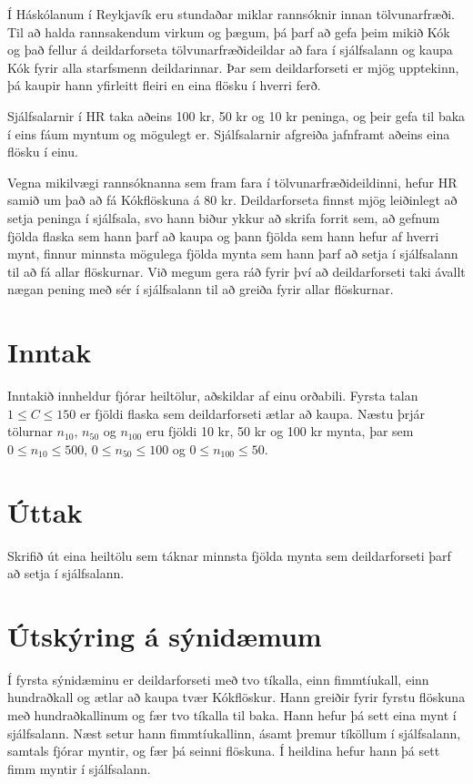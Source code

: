
Í Háskólanum í Reykjavík eru stundaðar miklar rannsóknir innan tölvunarfræði.
Til að halda rannsakendum virkum og þægum, þá þarf að gefa þeim mikið Kók og
það fellur á deildarforseta tölvunarfræðideildar að fara í sjálfsalann og kaupa
Kók fyrir alla starfsmenn deildarinnar. Þar sem deildarforseti er mjög
upptekinn, þá kaupir hann yfirleitt fleiri en eina flösku í hverri ferð.

Sjálfsalarnir í HR taka aðeins 100 kr, 50 kr og 10 kr peninga, og þeir gefa til
baka í eins fáum myntum og mögulegt er. Sjálfsalarnir afgreiða jafnframt aðeins
eina flösku í einu.

Vegna mikilvægi rannsóknanna sem fram fara í tölvunarfræðideildinni, hefur HR
samið um það að fá Kókflöskuna á 80 kr. Deildarforseta finnst mjög leiðinlegt
að setja peninga í sjálfsala, svo hann biður ykkur að skrifa forrit sem,
að gefnum fjölda flaska sem hann þarf að kaupa og þann fjölda sem hann hefur af
hverri mynt, finnur minnsta mögulega fjölda mynta sem hann þarf að setja í
sjálfsalann til að fá allar flöskurnar. Við megum gera ráð fyrir því að
deildarforseti taki ávallt nægan pening með sér í sjálfsalann til að greiða
fyrir allar flöskurnar.

\section*{Inntak}
Inntakið innheldur fjórar heiltölur, aðskildar
af einu orðabili. Fyrsta talan $1 \leq C \leq 150$ er fjöldi flaska
sem deildarforseti ætlar að kaupa. Næstu þrjár tölurnar
$n_{10}$, $n_{50}$ og $n_{100}$
eru fjöldi 10 kr, 50 kr og 100 kr mynta, þar sem $0 \leq n_{10}
\leq 500$, $0 \leq n_{50} \leq 100$ og $0 \leq n_{100} \leq 50$.

\section*{Úttak}
Skrifið út eina heiltölu sem táknar minnsta fjölda mynta sem deildarforseti
þarf að setja í sjálfsalann.

\section*{Útskýring á sýnidæmum}
Í fyrsta sýnidæminu er deildarforseti með tvo tíkalla, einn fimmtíukall, einn
hundraðkall og ætlar að kaupa tvær Kókflöskur. Hann greiðir fyrir fyrstu
flöskuna með hundraðkallinum og fær tvo tíkalla til baka. Hann hefur þá sett
eina mynt í sjálfsalann. Næst setur hann fimmtíukallinn, ásamt þremur tíköllum
í sjálfsalann, samtals fjórar myntir, og fær þá seinni flöskuna. Í heildina
hefur hann þá sett fimm myntir í sjálfsalann.

